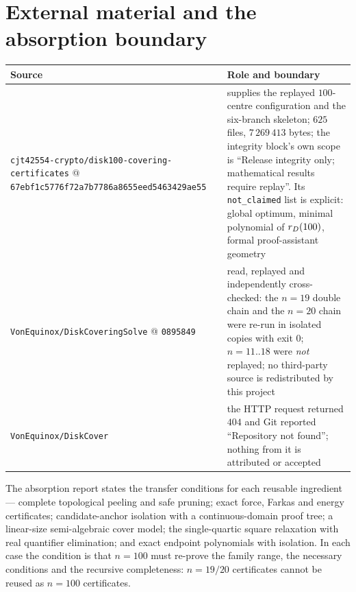 \section{External material and the absorption boundary}

\begin{center}
\footnotesize
\begin{tabular}{@{}>{\raggedright\arraybackslash}p{}>{\raggedright\arraybackslash}p{}@{}}
\toprule
Source & Role and boundary \\
\midrule
\texttt{cjt42554-\allowbreak{}crypto/\allowbreak{}disk100-\allowbreak{}covering-\allowbreak{}certificates}
@ \texttt{67ebf1c5776f72a7b7786a8655eed5463429ae55} &
supplies the replayed $100$-centre configuration and the six-branch skeleton; $625$ files,
$7\,269\,413$ bytes; the integrity block's own scope is ``Release integrity only; mathematical
results require replay''. Its \texttt{not\_\allowbreak{}claimed} list is explicit: global optimum, minimal
polynomial of $r_{D}(100)$, formal proof-assistant geometry \\
\texttt{VonEquinox/\allowbreak{}DiskCoveringSolve} @ \texttt{0895849} &
read, replayed and independently cross-checked: the $n=19$ double chain and the $n=20$ chain were
re-run in isolated copies with exit $0$; $n=11..18$ were \emph{not} replayed; no third-party source
is redistributed by this project \\
\texttt{VonEquinox/\allowbreak{}DiskCover} & the HTTP request returned $404$ and Git reported
``Repository not found''; nothing from it is attributed or accepted \\
\bottomrule
\end{tabular}
\end{center}

The absorption report states the transfer conditions for each reusable ingredient --- complete
topological peeling and safe pruning; exact force, Farkas and energy certificates; candidate-anchor
isolation with a continuous-domain proof tree; a linear-size semi-algebraic cover model; the
single-quartic square relaxation with real quantifier elimination; and exact endpoint polynomials
with isolation. In each case the condition is that $n=100$ must re-prove the family range, the
necessary conditions and the recursive completeness: $n=19/20$ certificates cannot be reused as
$n=100$ certificates.

